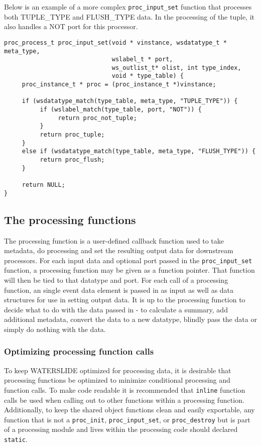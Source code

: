 \documentclass[11pt]{article}
\begin{document}
Below is an example of a more complex \texttt{proc\_input\_set} function that 
processes both TUPLE\_TYPE and FLUSH\_TYPE data. 
In the processing of the tuple, it also handles a NOT port for this processor.

\begin{lstlisting}
proc_process_t proc_input_set(void * vinstance, wsdatatype_t * meta_type,
                              wslabel_t * port,
                              ws_outlist_t* olist, int type_index,
                              void * type_table) {
     proc_instance_t * proc = (proc_instance_t *)vinstance;

     if (wsdatatype_match(type_table, meta_type, "TUPLE_TYPE")) {
          if (wslabel_match(type_table, port, "NOT")) {
               return proc_not_tuple;
          }
          return proc_tuple;
     }
     else if (wsdatatype_match(type_table, meta_type, "FLUSH_TYPE")) {
          return proc_flush;
     }

     return NULL;
}
\end{lstlisting}

\subsection{The processing functions}
The processing function is a user-defined callback function used to take 
metadata, do processing and set the resulting output data for downstream 
processors.  For each input data and optional 
port passed in the \texttt{proc\_input\_set} function, a processing function 
may be given as a function pointer.  That function will then be tied to that 
datatype and port. For each call of a processing function, an single event data
element is passed in as input as well as data structures for use in setting 
output data.  It is up to the processing function to decide what to do with the
data passed in - to calculate a summary, add additional metadata, convert the 
data to a new datatype, blindly pass the data or simply do nothing with 
the data.

\subsubsection{Optimizing processing function calls}
To keep WATERSLIDE optimized for processing data, it is desirable that processing 
functions be optimized to minimize conditional processing and function calls. 
To make code readable it is recommended that \texttt{inline} function calls be 
used when calling out to other functions within a processing function. 
Additionally, to keep the shared object functions clean and easily exportable, 
any function that is not a \texttt{proc\_init}, \texttt{proc\_input\_set}, 
or \texttt{proc\_destroy} but is part of a processing 
module and lives within the processing code should declared \texttt{static}.
\end{document}
